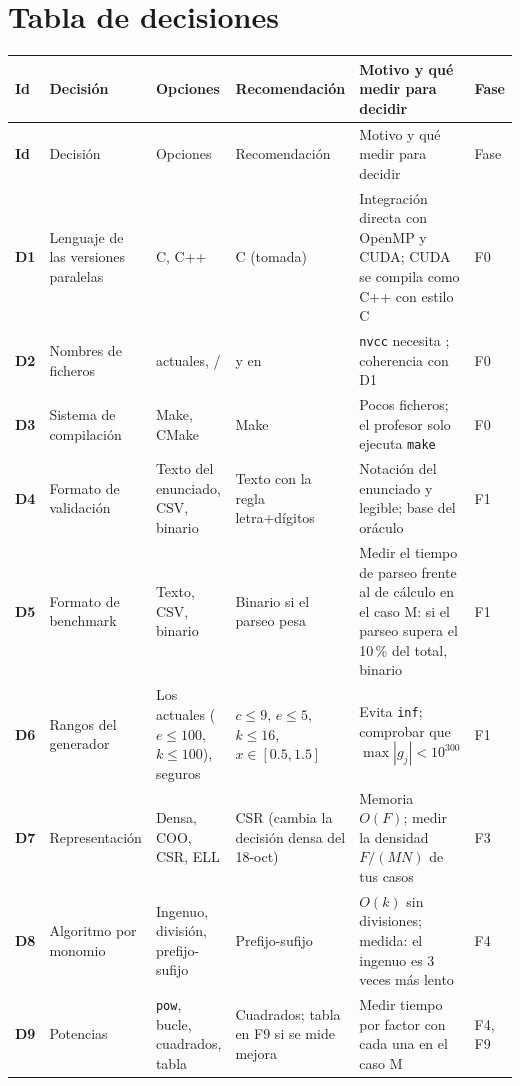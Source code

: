\section{Tabla de decisiones}\label{sec:decisiones}

{\footnotesize
\begin{xltabular}{\linewidth}{@{}>{\bfseries}p{0.6cm} >{\raggedright\arraybackslash}p{2.4cm} >{\raggedright\arraybackslash}p{3.0cm} >{\raggedright\arraybackslash}p{2.4cm} >{\raggedright\arraybackslash}X >{\raggedright\arraybackslash}p{0.8cm}@{}}
\toprule
Id & Decisión & Opciones & Recomendación & Motivo y qué medir para decidir & Fase \\
\midrule
\endfirsthead
\toprule
Id & Decisión & Opciones & Recomendación & Motivo y qué medir para decidir & Fase \\
\midrule
\endhead
\bottomrule
\endfoot
D1 & Lenguaje de las versiones paralelas & C, C++ & C (tomada) & Integración directa con OpenMP y CUDA; CUDA se compila como C++ con estilo C & F0 \\
D2 & Nombres de ficheros &  actuales, / &  y  en  & \texttt{nvcc} necesita ; coherencia con D1 & F0 \\
D3 & Sistema de compilación & Make, CMake & Make & Pocos ficheros; el profesor solo ejecuta \texttt{make} & F0 \\
D4 & Formato de validación & Texto del enunciado, CSV, binario & Texto con la regla letra+dígitos & Notación del enunciado y legible; base del oráculo & F1 \\
D5 & Formato de benchmark & Texto, CSV, binario & Binario si el parseo pesa & Medir el tiempo de parseo frente al de cálculo en el caso M: si el parseo supera el 10\,\% del total, binario & F1 \\
D6 & Rangos del generador & Los actuales ($e\le100$, $k\le100$), seguros & $c\le9$, $e\le5$, $k\le16$, $x\in[0.5,1.5]$ & Evita \texttt{inf}; comprobar que $\max|g_j|<10^{300}$ & F1 \\
D7 & Representación & Densa, COO, CSR, ELL & CSR (cambia la decisión densa del 18-oct) & Memoria $O(F)$; medir la densidad $F/(MN)$ de tus casos & F3 \\
D8 & Algoritmo por monomio & Ingenuo, división, prefijo-sufijo & Prefijo-sufijo & $O(k)$ sin divisiones; medida: el ingenuo es 3 veces más lento & F4 \\
D9 & Potencias & \texttt{pow}, bucle, cuadrados, tabla & Cuadrados; tabla en F9 si se mide mejora & Medir tiempo por factor con cada una en el caso M & F4, F9 \\

\end{xltabular}}
